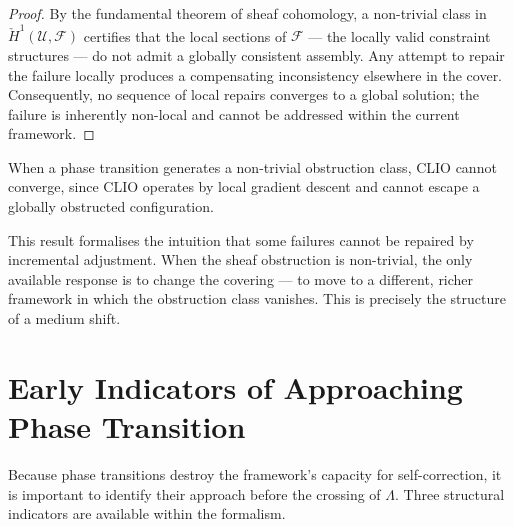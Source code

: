 \documentclass[11pt,openany]{book}
\begin{document}
\begin{proof}
By the fundamental theorem of sheaf cohomology, a
non-trivial class in $\check{H}^1(\mathcal{U},
\mathcal{F})$ certifies that the local sections of
$\mathcal{F}$ --- the locally valid constraint structures
--- do not admit a globally consistent assembly.  Any
attempt to repair the failure locally produces a
compensating inconsistency elsewhere in the cover.
Consequently, no sequence of local repairs converges to a
global solution; the failure is inherently non-local and
cannot be addressed within the current framework.
\end{proof}

\begin{corollary}
\label{cor:no-local-fix}
When a phase transition generates a non-trivial
obstruction class, CLIO cannot converge, since CLIO
operates by local gradient descent and cannot escape a
globally obstructed configuration.
\end{corollary}

This result formalises the intuition that some failures
cannot be repaired by incremental adjustment.  When the
sheaf obstruction is non-trivial, the only available
response is to change the covering --- to move to a
different, richer framework in which the obstruction class
vanishes.  This is precisely the structure of a medium
shift.

\section{Early Indicators of Approaching Phase Transition}
\label{sec:indicators}

Because phase transitions destroy the framework's capacity
for self-correction, it is important to identify their
approach before the crossing of $\Lambda$.  Three
structural indicators are available within the formalism.
\end{document}
